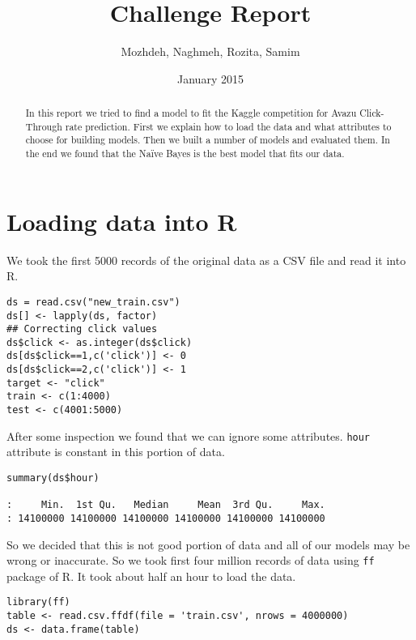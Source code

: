 \documentclass[11pt,a4paper]{article}
\author{Mozhdeh, Naghmeh, Rozita, Samim}
\date{January 2015}
\title{Challenge Report}
\begin{document}
\maketitle
\begin{abstract}
In this report we tried to find a model to fit the Kaggle competition for Avazu Click-Through rate prediction.
First we explain how to load the data and what attributes to choose for building models. Then we built a number of
models and evaluated them. In the end we found that the Naïve Bayes is the best model that fits our data.
\end{abstract}

\section{Loading data into R}
\label{sec-1}
We took the first 5000 records of the original data as a CSV file and read it into
R.

\begin{verbatim}
ds = read.csv("new_train.csv")
ds[] <- lapply(ds, factor)
## Correcting click values
ds$click <- as.integer(ds$click)
ds[ds$click==1,c('click')] <- 0
ds[ds$click==2,c('click')] <- 1
target <- "click"
train <- c(1:4000)
test <- c(4001:5000)
\end{verbatim}

After some inspection we found that we can ignore some attributes. \texttt{hour} attribute is
constant in this portion of data.

\begin{verbatim}
summary(ds$hour)

:     Min.  1st Qu.   Median     Mean  3rd Qu.     Max. 
: 14100000 14100000 14100000 14100000 14100000 14100000
\end{verbatim}

So we decided that this is not good portion of data and all of our models may be
wrong or inaccurate. So we took first four million records of data using \texttt{ff} package
of R. It took about half an hour to load the data.

\begin{verbatim}
library(ff)
table <- read.csv.ffdf(file = 'train.csv', nrows = 4000000)
ds <- data.frame(table)
\end{verbatim}
\end{document}
